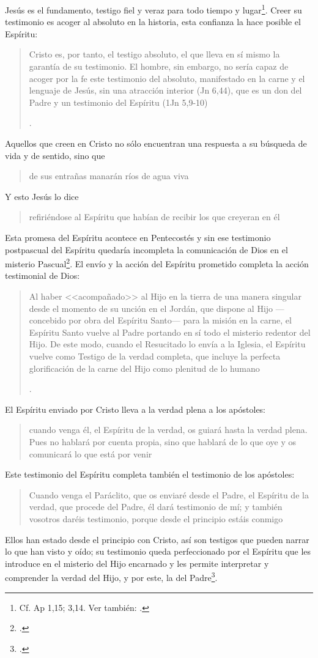 Jesús es el fundamento, testigo fiel y veraz para todo tiempo y lugar\footnote{Cf. Ap 1,15; 3,14. Ver también: \Cite[132]{prades2015testimonio}.}. Creer su testimonio es acoger al absoluto en la historia, esta confianza la hace posible el Espíritu: \blockquote[{\Cite{latourelle2000testimonio}}.]{Cristo es, por tanto, el testigo absoluto, el que lleva en sí mismo la garantía de su testimonio. El hombre, sin embargo, no sería capaz de acoger por la fe este testimonio del absoluto, manifestado en la carne y el lenguaje de Jesús, sin una atracción interior (Jn 6,44), que es un don del Padre y un testimonio del Espíritu (1Jn 5,9-10)}.

Aquellos que creen en Cristo no sólo encuentran una respuesta a su búsqueda de vida y de sentido, sino que \blockquote[][\,(Jn 7,38)]{de sus entrañas manarán ríos de agua viva}. Y esto Jesús lo dice \blockquote[][\,(Jn 7,39)]{refiriéndose al Espíritu que habían de recibir los que creyeran en él}. Esta promesa del Espíritu acontece en Pentecostés y sin ese testimonio postpascual del Espíritu quedaría incompleta la comunicación de Dios en el misterio Pascual\footcite[Cf.][135]{prades2015testimonio}. El envío y la acción del Espíritu prometido completa la acción testimonial de Dios: \blockquote[{\Cite[134-135]{prades2015testimonio}}.]{Al haber <<acompañado>> al Hijo en la tierra de una manera singular desde el momento de su unción en el Jordán, que dispone al Hijo ---concebido por obra del Espíritu Santo--- para la misión en la carne, el Espíritu Santo vuelve al Padre portando en sí todo el misterio redentor del Hijo. De este modo, cuando el Resucitado lo envía a la Iglesia, el Espíritu vuelve como Testigo de la verdad completa, que incluye la perfecta glorificación de la carne del Hijo como plenitud de lo humano}.

El Espíritu enviado por Cristo lleva a la verdad plena a los apóstoles: \blockquote[][\,(Jn 16,13)]{cuando venga él, el Espíritu de la verdad, os guiará hasta la verdad plena. Pues no hablará por cuenta propia, sino que hablará de lo que oye y os comunicará lo que está por venir}. Este testimonio del Espíritu completa también el testimonio de los apóstoles: \blockquote[][\,(Jn 15,26-27)]{Cuando venga el Paráclito, que os enviaré desde el Padre, el Espíritu de la verdad, que procede del Padre, él dará testimonio de mí; y también vosotros daréis testimonio, porque desde el principio estáis conmigo}. Ellos han estado desde el principio con Cristo, así son testigos que pueden narrar lo que han visto y oído; su testimonio queda perfeccionado por el Espíritu que les introduce en el misterio del Hijo encarnado y les permite interpretar y comprender la verdad del Hijo, y por este, la del Padre\footcite[Cf.][139]{prades2015testimonio}.

